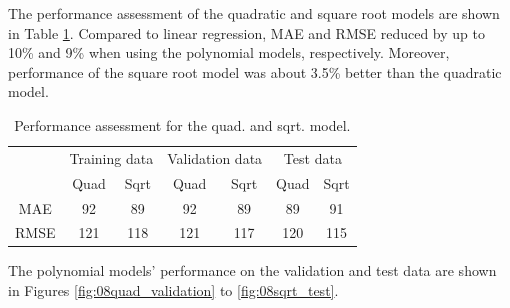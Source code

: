 The performance assessment of the quadratic and square root models are shown in Table \ref{tab:08quad_sqrt_performance}. Compared to linear regression, MAE and RMSE reduced by up to 10\% and 9\% when using the polynomial models, respectively. Moreover, performance of the square root model was about 3.5\% better than the quadratic model.
\begin{table}[h]
    \centering
    {
    \begin{tabular}{c|c|c|c|c|c|c|}
      & \multicolumn{2}{c|}{Training data} & \multicolumn{2}{c|}{Validation data} & \multicolumn{2}{c|}{Test data} \\ \cline{2-7} 
      & Quad             & Sqrt            & \multicolumn{1}{c|}{Quad}   & Sqrt   & Quad           & Sqrt          \\ \hline
    MAE   & 92               & 89              & 92                          & 89     & 89             & 91            \\
    RMSE  & 121              & 118             & \multicolumn{1}{c|}{121}    & 117    & 120            & 115           \\
    \end{tabular}}
    \caption{Performance assessment for the quad. and sqrt. model.}
    \label{tab:08quad_sqrt_performance}
\end{table}

The polynomial models' performance on the validation and test data are shown in Figures \ref{fig:08quad_validation} to \ref{fig:08sqrt_test}.  

